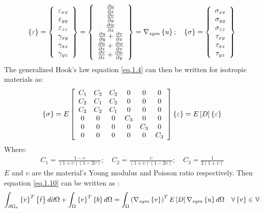 \begin{eqnarray}
\left\lbrace{\varepsilon}\right \rbrace=\left\lbrace \begin{array}{c}
\varepsilon_{xx}\\ \varepsilon_{yy}\\ \varepsilon_{zz}\\ \gamma_{xy} \\ \gamma_{xz}\\ \gamma_{yz}
\end{array} \right \rbrace=\left\lbrace \begin{array}{c}
\frac{\partial u}{\partial x}\\ \frac{\partial v}{\partial y}\\ \frac{\partial w}{\partial z}\\ \frac{\partial u}{\partial y}+\frac{\partial v}{\partial x} \\ \frac{\partial u}{\partial z}+\frac{\partial w}{\partial x}\\ \frac{\partial v}{\partial z}+\frac{\partial w}{\partial y}
\end{array} \right \rbrace = \nabla_{sym}\left\lbrace{u}\right \rbrace ;\quad \left\lbrace{\sigma}\right \rbrace=\left\lbrace \begin{array}{c}
\sigma_{xx}\\ \sigma_{yy}\\ \sigma_{zz}\\ \tau_{xy} \\ \tau_{xz}\\ \tau_{yz}
\end{array} \right \rbrace
\end{eqnarray}
The generalized Hook's law equation \eqref{eq.1.4} can then be written for isotropic materials as:
\begin{equation}
\left\lbrace{\sigma}\right \rbrace=E \left[{\begin{array}{cccccc}
	C_1 & C_2 & C_2 & 0 & 0 & 0\\
	C_2 & C_1 & C_2 & 0 & 0& 0 \\
	C_2 & C_2 & C_1  & 0 & 0& 0 \\
	0 & 0& 0& C_3 & 0 & 0 \\
	0& 0& 0& 0& C_3 & 0 \\
	0 & 0 & 0 & 0 & 0 & C_3
	\end{array}}\right] \left\lbrace{\varepsilon}\right \rbrace=E\left[{D}\right]\left\lbrace{\varepsilon}\right \rbrace
\end{equation}
Where:
\begin{eqnarray}
C_1=\frac{1-\upsilon}{(1+\upsilon)(1-2\upsilon)}; \quad C_2=\frac{\upsilon}{(1+\upsilon)(1-2\upsilon)}; \quad C_3=\frac{1}{2(1+\upsilon)}
\end{eqnarray}
$E$ and $\upsilon$ are the material's Young modulus and Poisson ratio respectively. Then equation \eqref{eq.1.10} can be written as :
\begin{eqnarray}
\label{eq.1.11b}
\int_{\partial \Omega_{\sigma}}{\left\lbrace{v}\right \rbrace^T \left\lbrace{\bar{t}}\right \rbrace d\partial \Omega}+\int_{\Omega}{\left\lbrace{v}\right \rbrace^T \left\lbrace{b}\right \rbrace d\Omega}=\int_{\Omega}{\left(\nabla_{sym}\left\lbrace{v}\right \rbrace\right)^T E\left[{D}\right] \nabla_{sym}\left\lbrace{u}\right \rbrace d\Omega}\quad \forall \left\lbrace{v}\right \rbrace \in \mathbb{V}
\end{eqnarray}
